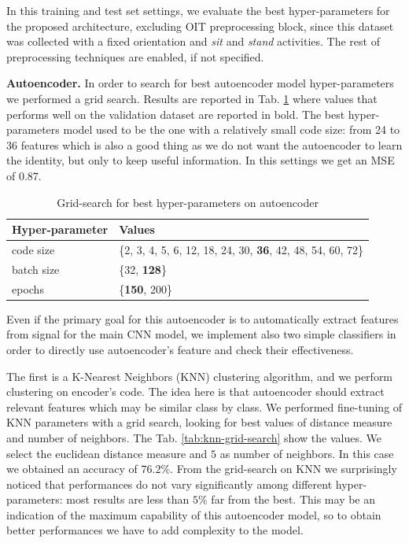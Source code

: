 In this training and test set settings, we evaluate the best
hyper-parameters for the proposed architecture, excluding OIT
preprocessing block, since this dataset was collected with a fixed
orientation and \textit{sit} and \textit{stand} activities. The rest
of preprocessing techniques are enabled, if not specified.

\textbf{Autoencoder.} In order to search for best autoencoder model
hyper-parameters we performed a grid search. Results are reported in
Tab. \ref{tab:ae-hyperparams} where values that performs well on the
validation dataset are reported in bold. The best hyper-parameters
model used to be the one with a relatively small code size: from 24 to
36 features which is also a good thing as we do not want the
autoencoder to learn the identity, but only to keep useful
information. In this settings we get an MSE of $0.87$.

\begin{table}[h]
  \centering
  \begin{tabular}{lp{4cm}}
    \hline
    Hyper-parameter & Values \\
    \hline
    code size & \{2, 3, 4, 5, 6, 12, 18, 24, 30, \textbf{36}, 42, 48, 54, 60, 72\} \\
    batch size & \{32, \textbf{128}\} \\
    epochs & \{\textbf{150}, 200\} \\
    \hline
  \end{tabular}
  \caption{Grid-search for best hyper-parameters on autoencoder}
  \label{tab:ae-hyperparams}
\end{table}

Even if the primary goal for this autoencoder is to automatically
extract features from signal for the main CNN model, we implement also
two simple classifiers in order to directly use autoencoder's feature
and check their effectiveness.

The first is a K-Nearest Neighbors (KNN) clustering algorithm, and we
perform clustering on encoder's code. The idea here is that
autoencoder should extract relevant features which may be similar
class by class. We performed fine-tuning of KNN parameters with a grid
search, looking for best values of distance measure and number of
neighbors. The Tab. \ref{tab:knn-grid-search} show the values.  We
select the euclidean distance measure and $5$ as number of neighbors.
In this case we obtained an accuracy of $76.2$\%.  From the
grid-search on KNN we surprisingly noticed that performances do not
vary significantly among different hyper-parameters: most results are
less than $5$\% far from the best. This may be an indication of the
maximum capability of this autoencoder model, so to obtain better
performances we have to add complexity to the model.

